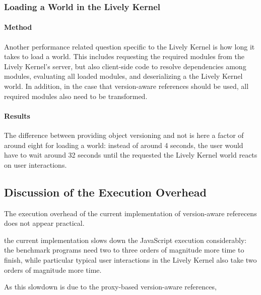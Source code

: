 \subsubsection{Loading a World in the Lively Kernel}

\paragraph{Method}
Another performance related question specific to the Lively Kernel is how long it takes to load a world.
This includes requesting the required modules from the Lively Kernel's server, but also client-side code to resolve dependencies among modules, evaluating all loaded modules, and deserializing a the Lively Kernel world.
In addition, in the case that version-aware references should be used, all required modules also need to be transformed.

\paragraph{Results}
The difference between providing object versioning and not is here a factor of around eight for loading a world: instead of around 4 seconds, the user would have to wait around 32 seconds until the requested the Lively Kernel world reacts on user interactions.



\subsection{Discussion of the Execution Overhead}


The execution overhead of the current implementation of version-aware referecens does not appear practical.

the current implementation slows down the JavaScript execution considerably: the benchmark programs need two to three orders of magnitude more time to finish, while particular typical user interactions in the Lively Kernel also take two orders of magnitude more time.


As this slowdown is due to the proxy-based version-aware references,

